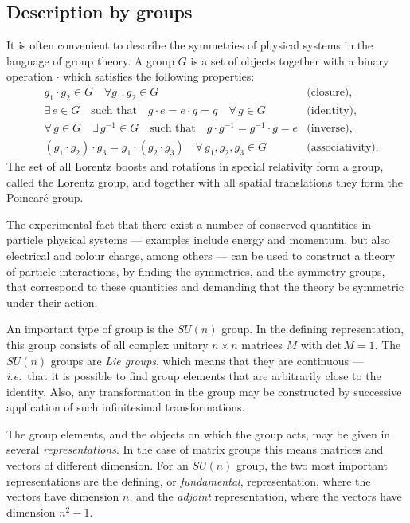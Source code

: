 \documentclass[twoside,english]{uiofysmaster}
\begin{document}
\subsection{Description by groups}
It is often convenient to describe the symmetries of physical systems in the language of group theory. A group $G$ is a set of objects together with a binary operation $\cdot$ which satisfies the following properties:
\begin{align}
  &g_1\cdot g_2 \in G \quad \forall g_1, g_2 \in G &\text{(closure)},\\
  &\exists \, e \in G \quad \text{such that} \quad g\cdot e = e \cdot g = g \quad \forall \, g \in G &\text{(identity)},\\
  &\forall \, g \in G \quad \exists \, g^{-1} \in G \quad \text{such that} \quad g\cdot g^{-1} = g^{-1}\cdot g = e &\text{(inverse)},\\
  &(g_1\cdot g_2)\cdot g_3 = g_1\cdot(g_2\cdot g_3) \quad \forall \, g_1, g_2, g_3 \in G &\text{(associativity)}.
\end{align}
The set of all Lorentz boosts and rotations in special relativity form a group, called the Lorentz group, and together with all spatial translations they form the Poincar\'{e} group. 

The experimental fact that there exist a number of conserved quantities in particle physical systems --- examples include energy and momentum, but also electrical and colour charge, among others --- can be used to construct a theory of particle interactions, by finding the symmetries, and the symmetry groups, that correspond to these quantities and demanding that the theory be symmetric under their action.

An important type of group is the $SU(n)$ group. In the defining representation, this group consists of all complex unitary $n\times n$ matrices $M$ with $\mathrm{det}\,M=1$. The $SU(n)$ groups are {\it Lie groups}, which means that they are continuous --- {\it i.e.}\ that it is possible to find group elements that are arbitrarily close to the identity. Also, any transformation in the group may be constructed by successive application of such infinitesimal transformations. 

The group elements, and the objects on which the group acts, may be given in several {\it representations}. In the case of matrix groups this means matrices and vectors of different dimension. For an $SU(n)$ group, the two most important representations are the defining, or {\it fundamental}, representation, where the vectors have dimension $n$, and the {\it adjoint} representation, where the vectors have dimension $n^2-1$.
\end{document}
